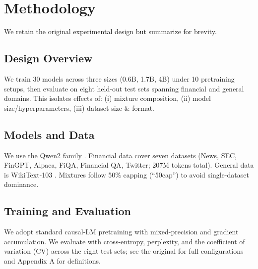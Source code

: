 \chapter{Methodology}

We retain the original experimental design but summarize for brevity.

\section{Design Overview}
We train 30 models across three sizes (0.6B, 1.7B, 4B) under 10 pretraining setups, then evaluate on eight held-out test sets spanning financial and general domains. This isolates effects of: (i) mixture composition, (ii) model size/hyperparameters, (iii) dataset size \& format.

\section{Models and Data}
We use the Qwen2 family \parencite{yang2024qwen2}. Financial data cover seven datasets (News, SEC, FinGPT, Alpaca, FiQA, Financial QA, Twitter; 207M tokens total). General data is WikiText-103 \parencite{merity2016pointer}. Mixtures follow 50\% capping (``50cap'') to avoid single-dataset dominance.

\section{Training and Evaluation}
We adopt standard causal-LM pretraining with mixed-precision and gradient accumulation. We evaluate with cross-entropy, perplexity, and the coefficient of variation (CV) across the eight test sets; see the original for full configurations and Appendix A for definitions.


